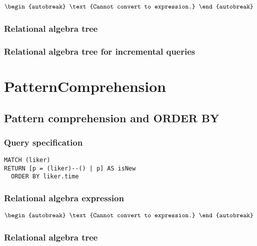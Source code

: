 \begin{align*}
\begin{autobreak}
\text{Cannot convert to expression.}
\end{autobreak}
\end{align*}

\subsubsection*{Relational algebra tree}


\subsubsection*{Relational algebra tree for incremental queries}

\section{PatternComprehension}


\subsection{Pattern comprehension and ORDER BY}

\subsubsection*{Query specification}

\begin{lstlisting}
MATCH (liker)
RETURN [p = (liker)--() | p] AS isNew
  ORDER BY liker.time
\end{lstlisting}

\subsubsection*{Relational algebra expression}

\begin{align*}
\begin{autobreak}
\text{Cannot convert to expression.}
\end{autobreak}
\end{align*}

\subsubsection*{Relational algebra tree}

